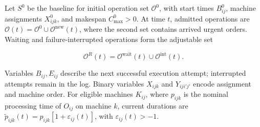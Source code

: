 Let $S^0$ be the baseline for initial operation set $\mathcal O^0$, with start times $B^0_{ij}$,
machine assignments $X^0_{ijk}$, and makespan $C^0_{\max}>0$. At time $t$, admitted operations are
$\mathcal O(t)=\mathcal O^0\cup\mathcal O^{\mathrm{new}}(t)$, where the second set contains arrived urgent orders.
Waiting and failure-interrupted operations form the adjustable set


\begin{equation}
 \mathcal O^R(t)=\mathcal O^{\mathrm{wait}}(t)\cup\mathcal O^{\mathrm{int}}(t).
 \label{eq:adjustable_operations}
\end{equation}

Variables $B_{ij},E_{ij}$ describe the next successful execution attempt; interrupted attempts remain in the log.
Binary variables $X_{ijk}$ and $Y_{iji'j'}$ encode assignment and machine order. For eligible machines $K_{ij}$,
where $p_{ijk}$ is the nominal processing time of $O_{ij}$ on machine $k$, current durations are $\widetilde p_{ijk}(t)=p_{ijk}[1+\varepsilon_{ij}(t)]$, with $\varepsilon_{ij}(t)>-1$.


